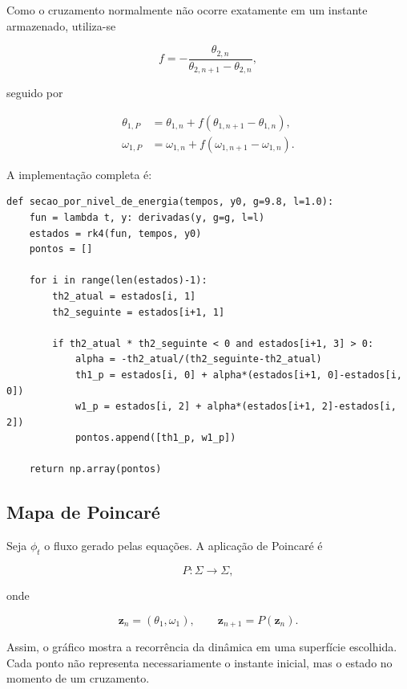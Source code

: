 \documentclass[12pt,a4paper]{article}
\begin{document}
Como o cruzamento normalmente não ocorre exatamente em um instante armazenado, utiliza-se

\begin{equation}
f=-\frac{\theta_{2,n}}{\theta_{2,n+1}-\theta_{2,n}},
\end{equation}

seguido por

\begin{align}
\theta_{1,P}&=\theta_{1,n}+f(\theta_{1,n+1}-\theta_{1,n}),\\
\omega_{1,P}&=\omega_{1,n}+f(\omega_{1,n+1}-\omega_{1,n}).
\end{align}

A implementação completa é:

\begin{lstlisting}
def secao_por_nivel_de_energia(tempos, y0, g=9.8, l=1.0):
    fun = lambda t, y: derivadas(y, g=g, l=l)
    estados = rk4(fun, tempos, y0)
    pontos = []

    for i in range(len(estados)-1):
        th2_atual = estados[i, 1]
        th2_seguinte = estados[i+1, 1]

        if th2_atual * th2_seguinte < 0 and estados[i+1, 3] > 0:
            alpha = -th2_atual/(th2_seguinte-th2_atual)
            th1_p = estados[i, 0] + alpha*(estados[i+1, 0]-estados[i, 0])
            w1_p = estados[i, 2] + alpha*(estados[i+1, 2]-estados[i, 2])
            pontos.append([th1_p, w1_p])

    return np.array(pontos)
\end{lstlisting}

\subsection{Mapa de Poincaré}

Seja $\phi_t$ o fluxo gerado pelas equações. A aplicação de Poincaré é

\begin{equation}
P:\Sigma\rightarrow\Sigma,
\end{equation}

onde

\begin{equation}
\mathbf z_n=(\theta_1,\omega_1),
\qquad
\mathbf z_{n+1}=P(\mathbf z_n).
\end{equation}

Assim, o gráfico mostra a recorrência da dinâmica em uma superfície escolhida. Cada ponto não representa necessariamente o instante inicial, mas o estado no momento de um cruzamento.
\end{document}
